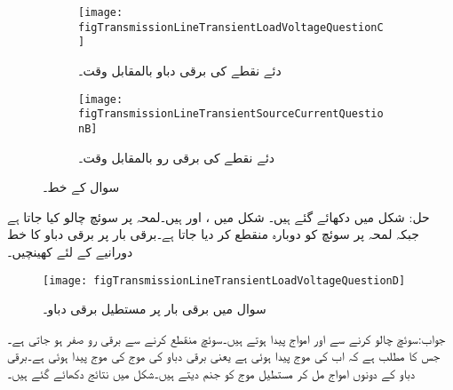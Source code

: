 \begin{figure}
\centering
\begin{subfigure}{0.8\textwidth}
\centering
\texttt{[image: figTransmissionLineTransientLoadVoltageQuestionC]}
\caption{ دئے نقطے کی برقی دباو بالمقابل وقت۔}
\label{شکل_ترسیلی_جواب_سوال_پ}
\end{subfigure}%

\begin{subfigure}{0.8\textwidth}
\centering
\texttt{[image: figTransmissionLineTransientSourceCurrentQuestionB]}
\caption{دئے نقطے کی برقی رو بالمقابل وقت۔}
\label{شکل_ترسیلی_جواب_منبع_رو_سوال_پ}
\end{subfigure}%
\caption{سوال  کے خط۔}
\label{شکل_سوال_ترسیلی_سوال_پ}
\end{figure}
حل: شکل   میں دکھائے گئے ہیں۔
شکل   میں  ،  اور  ہیں۔لمحہ  پر سوئچ چالو کیا جاتا ہے جبکہ لمحہ  پر سوئچ کو دوبارہ منقطع کر دیا جاتا ہے۔برقی بار پر برقی دباو کا خط  دورانیے کے لئے کھینچیں۔
\begin{figure}
\centering
\texttt{[image: figTransmissionLineTransientLoadVoltageQuestionD]}
\caption{سوال  میں برقی بار پر مستطیل برقی دباو۔}
\label{شکل_ترسیلی_سوال_مستطیل_دباو}
\end{figure}
جواب:سوئچ چالو کرنے سے  اور  امواج پیدا ہوتے ہیں۔سوئچ منقطع کرنے سے برقی رو صفر ہو جاتی ہے۔جس کا مطلب ہے کہ اب  کی موج پیدا ہوئی ہے یعنی برقی دباو کی موج  کی موج پیدا ہوئی ہے۔برقی دباو کے دونوں امواج مل کر مستطیل موج کو جنم دیتے ہیں۔شکل  میں نتائج دکھائے گئے ہیں۔
